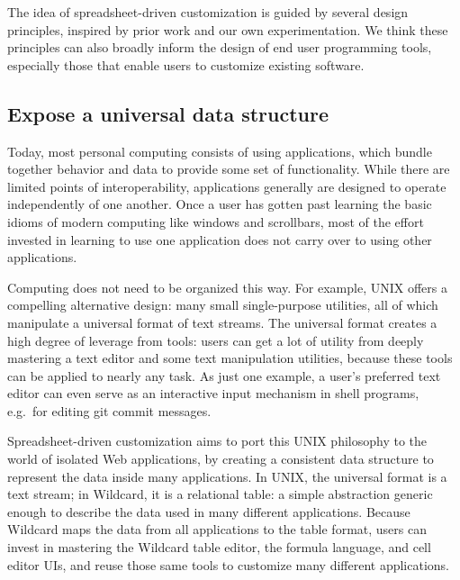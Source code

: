 \documentclass[english,submission]{programming}
\begin{document}
The idea of spreadsheet-driven customization is guided by several design
principles, inspired by prior work and our own experimentation. We think
these principles can also broadly inform the design of end user
programming tools, especially those that enable users to customize
existing software.

\hypertarget{expose-a-universal-data-structure}{%
\subsection{Expose a universal data
structure}\label{expose-a-universal-data-structure}}

Today, most personal computing consists of using applications, which
bundle together behavior and data to provide some set of functionality.
While there are limited points of interoperability, applications
generally are designed to operate independently of one another. Once a
user has gotten past learning the basic idioms of modern computing like
windows and scrollbars, most of the effort invested in learning to use
one application does not carry over to using other applications.

Computing does not need to be organized this way. For example, UNIX
offers a compelling alternative design: many small single-purpose
utilities, all of which manipulate a universal format of text streams.
The universal format creates a high degree of leverage from tools: users
can get a lot of utility from deeply mastering a text editor and some
text manipulation utilities, because these tools can be applied to
nearly any task. As just one example, a user's preferred text editor can
even serve as an interactive input mechanism in shell programs, e.g.~for
editing git commit messages.

Spreadsheet-driven customization aims to port this UNIX philosophy to
the world of isolated Web applications, by creating a consistent data
structure to represent the data inside many applications. In UNIX, the
universal format is a text stream; in Wildcard, it is a relational
table: a simple abstraction generic enough to describe the data used in
many different applications. Because Wildcard maps the data from all
applications to the table format, users can invest in mastering the
Wildcard table editor, the formula language, and cell editor UIs, and
reuse those same tools to customize many different applications.
\end{document}
